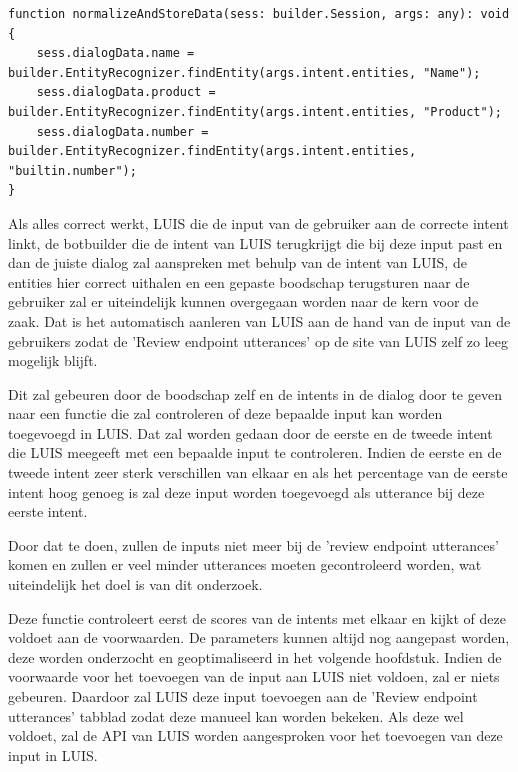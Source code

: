 \medskip
\begin{lstlisting}[caption=Analyseren van de intent]
function normalizeAndStoreData(sess: builder.Session, args: any): void {
	sess.dialogData.name = builder.EntityRecognizer.findEntity(args.intent.entities, "Name");
	sess.dialogData.product = builder.EntityRecognizer.findEntity(args.intent.entities, "Product");
	sess.dialogData.number = builder.EntityRecognizer.findEntity(args.intent.entities, "builtin.number");
}
\end{lstlisting}

Als alles correct werkt, LUIS die de input van de gebruiker aan de correcte intent linkt, de botbuilder die de intent van LUIS terugkrijgt die bij deze input past en dan de juiste dialog zal aanspreken met behulp van de intent van LUIS, de entities hier correct uithalen en een gepaste boodschap terugsturen naar de gebruiker zal er uiteindelijk kunnen overgegaan worden naar de kern voor de zaak. Dat is het automatisch aanleren van LUIS aan de hand van de input van de gebruikers zodat de 'Review endpoint utterances' op de site van LUIS zelf zo leeg mogelijk blijft.

Dit zal gebeuren door de boodschap zelf en de intents in de dialog door te geven naar een functie die zal controleren of deze bepaalde input kan worden toegevoegd in LUIS. Dat zal worden gedaan door de eerste en de tweede intent die LUIS meegeeft met een bepaalde input te controleren. Indien de eerste en de tweede intent zeer sterk verschillen van elkaar en als het percentage van de eerste intent hoog genoeg is zal deze input worden toegevoegd als utterance bij deze eerste intent.

Door dat te doen, zullen de inputs niet meer bij de 'review endpoint utterances' komen en zullen er veel minder utterances moeten gecontroleerd worden, wat uiteindelijk het doel is van dit onderzoek.

Deze functie controleert eerst de scores van de intents met elkaar en kijkt of deze voldoet aan de voorwaarden. De parameters kunnen altijd nog aangepast worden, deze worden onderzocht en geoptimaliseerd in het volgende hoofdstuk. Indien de voorwaarde voor het toevoegen van de input aan LUIS niet voldoen, zal er niets gebeuren. Daardoor zal LUIS deze input toevoegen aan de 'Review endpoint utterances' tabblad zodat deze manueel kan worden bekeken. Als deze wel voldoet, zal de API van LUIS worden aangesproken voor het toevoegen van deze input in LUIS.

